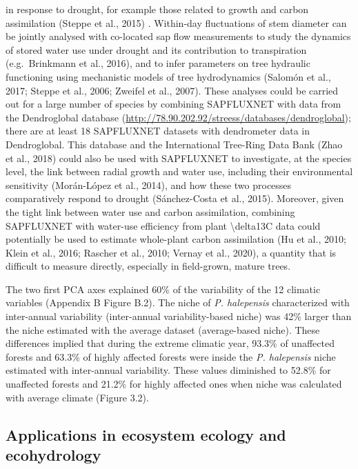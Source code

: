 \documentclass[11pt,twoside]{reedthesis}
\begin{document}
in response to drought, for example those related to growth and carbon
assimilation (Steppe et al., 2015) . Within-day fluctuations of stem
diameter can be jointly analysed with co-located sap flow measurements
to study the dynamics of stored water use under drought and its
contribution to transpiration (e.g.~Brinkmann et al., 2016), and to
infer parameters on tree hydraulic functioning using mechanistic models
of tree hydrodynamics (Salomón et al., 2017; Steppe et al., 2006;
Zweifel et al., 2007). These analyses could be carried out for a large
number of species by combining SAPFLUXNET with data from the
Dendroglobal database
(\url{http://78.90.202.92/streess/databases/dendroglobal}); there are at
least 18 SAPFLUXNET datasets with dendrometer data in Dendroglobal. This
database and the International Tree-Ring Data Bank (Zhao et al., 2018)
could also be used with SAPFLUXNET to investigate, at the species level,
the link between radial growth and water use, including their
environmental sensitivity (Morán-López et al., 2014), and how these two
processes comparatively respond to drought (Sánchez-Costa et al., 2015).
Moreover, given the tight link between water use and carbon
assimilation, combining SAPFLUXNET with water-use efficiency from plant
\textbackslash{}delta13C data could potentially be used to estimate
whole-plant carbon assimilation (Hu et al., 2010; Klein et al., 2016;
Rascher et al., 2010; Vernay et al., 2020), a quantity that is difficult
to measure directly, especially in field-grown, mature trees.\par

The two first PCA axes explained 60\% of the variability of the 12
climatic variables (Appendix B Figure B.2). The niche of \emph{P.
halepensis} characterized with inter-annual variability (inter-annual
variability-based niche) was 42\% larger than the niche estimated with
the average dataset (average-based niche). These differences implied
that during the extreme climatic year, 93.3\% of unaffected forests and
63.3\% of highly affected forests were inside the \emph{P. halepensis}
niche estimated with inter-annual variability. These values diminished
to 52.8\% for unaffected forests and 21.2\% for highly affected ones
when niche was calculated with average climate (Figure 3.2).\par

\subsection{Applications in ecosystem ecology and
ecohydrology}\label{applications-in-ecosystem-ecology-and-ecohydrology}
\end{document}
